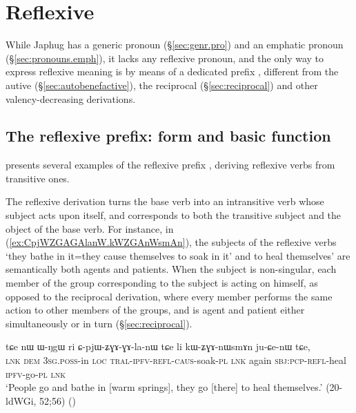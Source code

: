 \section{Reflexive} \label{sec:reflexive}
While Japhug has a generic pronoun  (§\ref{sec:genr.pro}) and an emphatic pronoun  (§\ref{sec:pronouns.emph}), it lacks any reflexive pronoun, and the only way to express reflexive meaning is by means of a dedicated prefix , different from the autive (§\ref{sec:autobenefactive}), the reciprocal (§\ref{sec:reciprocal}) and other valency-decreasing derivations.

\subsection{The reflexive prefix: form and basic function}
 presents several examples of the reflexive prefix ,  deriving reflexive verbs from transitive ones.

The reflexive derivation turns the base verb into an intransitive verb whose subject acts upon itself, and corresponds to both the transitive subject and the object of the base verb. For instance, in (\ref{ex:CpjWZGAGAlanW.kWZGAnWsmAn}), the subjects of the reflexive verbs  `they bathe in it=they cause themselves to soak in it' and  to heal themselves' are semantically both agents and patients.  When the subject is non-singular, each member of the group corresponding to the subject is acting on himself, as opposed to the reciprocal derivation, where every member performs the same action to other members of the groups, and is agent and patient either simultaneously or in turn (§\ref{sec:reciprocal}).

\begin{exe}
\ex \label{ex:CpjWZGAGAlanW.kWZGAnWsmAn}
 \gll   %
  tɕe nɯ ɯ-ŋgɯ ri ɕ-pjɯ-ʑɣɤ-ɣɤ-la-nɯ tɕe li kɯ-ʑɣɤ-nɯsmɤn ju-ɕe-nɯ tɕe, \\
\textsc{lnk} \textsc{dem} \textsc{3sg}.\textsc{poss}-in \textsc{loc} \textsc{tral}-\textsc{ipfv}-\textsc{refl}-\textsc{caus}-soak-\textsc{pl} \textsc{lnk} again \textsc{sbj}:\textsc{pcp}-\textsc{refl}-heal \textsc{ipfv}-go-\textsc{pl} \textsc{lnk} \\
\glt `People go and bathe in [warm springs], they go [there] to heal themselves.' (20-ldWGi, 52;56) ()
 \end{exe}
  
